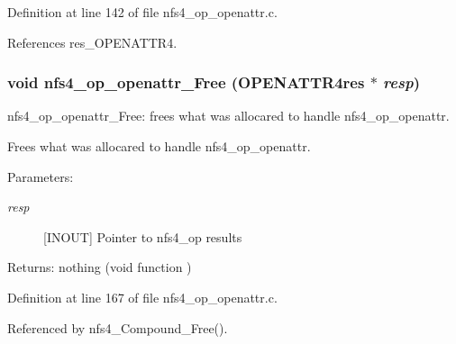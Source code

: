 Definition at line 142 of file nfs4\_\-op\_\-openattr.c.

References res\_\-OPENATTR4.
\subsubsection{\setlength{\rightskip}{0pt plus 5cm}void nfs4\_\-op\_\-openattr\_\-Free (OPENATTR4res $\ast$ {\em resp})}\label{nfs4__op__openattr_8c_a3}


nfs4\_\-op\_\-openattr\_\-Free: frees what was allocared to handle nfs4\_\-op\_\-openattr.

Frees what was allocared to handle nfs4\_\-op\_\-openattr.

\begin{Desc}
\item[Parameters:]
\begin{description}
\item[{\em resp}][INOUT] Pointer to nfs4\_\-op results\end{description}
\end{Desc}
\begin{Desc}
\item[Returns:]nothing (void function ) \end{Desc}


Definition at line 167 of file nfs4\_\-op\_\-openattr.c.

Referenced by nfs4\_\-Compound\_\-Free().